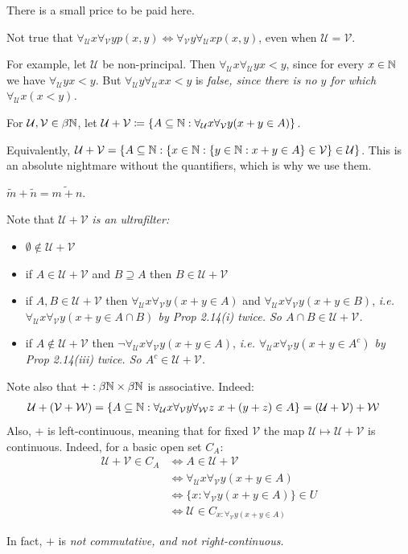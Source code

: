 \documentclass[10pt]{article}
\newcommand{\U}{\mathcal{U}}
\newcommand{\V}{\mathcal{V}}
\newcommand{\fu}{\forall_\U}
\newcommand{\for}[1]{\forall_{#1}}
\begin{document}
There is a small price to be paid here.

\begin{remark*}
    Not true that $\fu x\for{\V}y p(x,y) \iff \for{\V}y \fu xp(x,y)$, even when $\U = \V$.

    For example, let $\U$ be non-principal. Then $\fu x\fu y x < y$, since for every $x\in \mathbb{N}$ we have $\fu y x < y$. But $\fu y \fu x x <y$ is \it{false}, since there is no $y$ for which $\fu x (x<y)$.
\end{remark*}

\begin{defin*}
    For $\U,\V\in \beta\N$, let $\U + \V \coloneqq \{A\subset\N : \fu x\for{\V}y (x+y\in A)\}$.

    Equivalently, $\U+\V = \{A\subset\N : \{x\in \N : \{y \in \N : x + y \in A\} \in \V\}\in \U\}$. This is an absolute nightmare without the quantifiers, which is why we use them.
\end{defin*}

\begin{remark*}[Example] $\tilde{m} + \tilde{n} = \widetilde{m+n}$.  
\end{remark*}

Note that $\U + \V$ \it{is} an ultrafilter:
\begin{itemize}
    \item $\emptyset\not\in \U + \V$
    \item if $A \in \U + \V$ and $B \supseteq A$ then $B \in \U + \V$
    \item if $A,B\in \U + \V$ then $\fu x \for{\V} y (x + y \in A)$ and $\fu x \for{\V} y (x + y \in B)$, \it{i.e.} $\fu x\for{\V} y (x + y \in A \cap B)$ by Prop 2.14(i) twice. So $A\cap B \in \U + \V$.
    \item if $A\not\in \U + \V$ then $\neg \fu x\for{\V} y (x + y \in A)$, \it{i.e.} $\fu x \for{\V} y (x + y \in A^c)$ by Prop 2.14(iii) twice. So $A^c \in \U + \V$.
\end{itemize}

Note also that $+:\beta\mathbb{N} \times \beta\mathbb{N}$ is associative. Indeed:
\begin{align*}
    \U + (\mathcal{V}+\mathcal{W}) &= \{A\subset \N: \fu x\for{\V}y\for{\mathcal{W}}z\ x+(y+z)\in A\} = (\U + \V)+\mathcal{W}
\end{align*}
Also, $+$ is left-continuous, meaning that for fixed $\V$ the map $\U\mapsto \U + \V$ is continuous. Indeed, for a basic open set $C_A$:
\begin{align*}
    \U + \V \in C_A &\iff A \in \U + \V\\
    &\iff \fu x\for{\V}y (x+y\in A)\\
    &\iff \{x : \for{\V}y(x+y\in A)\}\in U\\
    &\iff \U \in C_{x:\for{\V}y(x+y\in A)}
\end{align*}
\begin{remark*}
    In fact, $+$ is \it{not} commutative, and not right-continuous.
\end{remark*}
\end{document}
